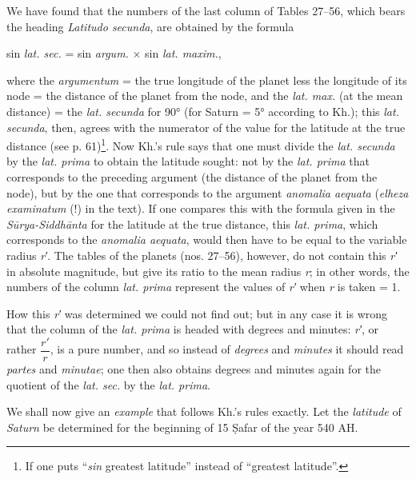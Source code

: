 \documentclass[11pt]{article}
\begin{document}
\par We have found that the numbers of the last column of Tables 27–56, which bears the heading \emph{Latitudo secunda}, are obtained by the formula\par
\par\begin{center}sin \emph{lat. sec.} = sin \emph{argum.} × sin \emph{lat. maxim.},\end{center}
\par where the \emph{argumentum} = the true longitude of the planet less the longitude of its node = the distance of the planet from the node, and the \emph{lat. max.} (at the mean distance) = the \emph{lat. secunda} for 90° (for Saturn = 5° according to Kh.); this \emph{lat. secunda}, then, agrees with the numerator of the value for the latitude at the true distance (see p. 61)\footnote{If one puts “\emph{sin} greatest latitude” instead of “greatest latitude”.}. Now Kh.'s rule says that one must divide the \emph{lat. secunda} by the \emph{lat. prima} to obtain the latitude sought: not by the \emph{lat. prima} that corresponds to the preceding argument (the distance of the planet from the node), but by the one that corresponds to the argument \emph{anomalia aequata} (\emph{elheza examinatum} (!) in the text). If one compares this with the formula given in the \emph{Sūrya-Siddhānta} for the latitude at the true distance, this \emph{lat. prima}, which corresponds to the \emph{anomalia aequata}, would then have to be equal to the variable radius \emph{r′}. The tables of the planets (nos. 27–56), however, do not contain this \emph{r′} in absolute magnitude, but give its ratio to the mean radius \emph{r}; in other words, the numbers of the column \emph{lat. prima} represent the values of \emph{r′} when \emph{r} is taken = 1.\par
\par How this \emph{r′} was determined we could not find out; but in any case it is wrong that the column of the \emph{lat. prima} is headed with degrees and minutes: \emph{r′}, or rather $\dfrac{r'}{r}$, is a pure number, and so instead of \emph{degrees} and \emph{minutes} it should read \emph{partes} and \emph{minutae}; one then also obtains degrees and minutes again for the quotient of the \emph{lat. sec.} by the \emph{lat. prima}.\par
\par We shall now give an \emph{example} that follows Kh.'s rules exactly. Let the \emph{latitude} of \emph{Saturn} be determined for the beginning of 15 Ṣafar of the year 540 AH.\par
\end{document}
